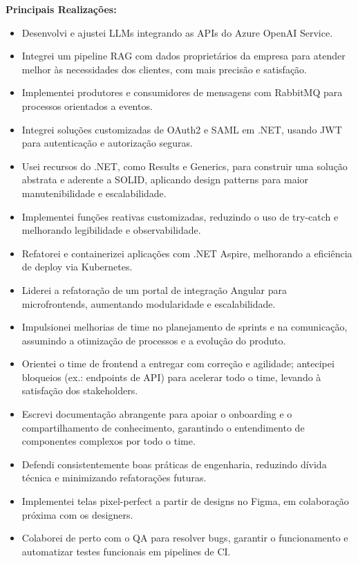 \documentclass[10pt,a4paper]{altacv}
\begin{document}
\textbf{Principais Realizações:}
\begin{itemize}
\setlength{\itemindent}{0.5em}
\item[--] Desenvolvi e ajustei LLMs integrando as APIs do Azure OpenAI Service.
\item[--] Integrei um pipeline RAG com dados proprietários da empresa para atender melhor às necessidades dos clientes, com mais precisão e satisfação.
\item[--] Implementei produtores e consumidores de mensagens com RabbitMQ para processos orientados a eventos.
\item[--] Integrei soluções customizadas de OAuth2 e SAML em .NET, usando JWT para autenticação e autorização seguras.
\item[--] Usei recursos do .NET, como Results e Generics, para construir uma solução abstrata e aderente a SOLID, aplicando design patterns para maior manutenibilidade e escalabilidade.
\item[--] Implementei funções reativas customizadas, reduzindo o uso de try-catch e melhorando legibilidade e observabilidade.
\item[--] Refatorei e containerizei aplicações com .NET Aspire, melhorando a eficiência de deploy via Kubernetes.
\item[--] Liderei a refatoração de um portal de integração Angular para microfrontends, aumentando modularidade e escalabilidade.
\item[--] Impulsionei melhorias de time no planejamento de sprints e na comunicação, assumindo a otimização de processos e a evolução do produto.
\item[--] Orientei o time de frontend a entregar com correção e agilidade; antecipei bloqueios (ex.: endpoints de API) para acelerar todo o time, levando à satisfação dos stakeholders.
\item[--] Escrevi documentação abrangente para apoiar o onboarding e o compartilhamento de conhecimento, garantindo o entendimento de componentes complexos por todo o time.
\item[--] Defendi consistentemente boas práticas de engenharia, reduzindo dívida técnica e minimizando refatorações futuras.
\item[--] Implementei telas pixel-perfect a partir de designs no Figma, em colaboração próxima com os designers.
\item[--] Colaborei de perto com o QA para resolver bugs, garantir o funcionamento e automatizar testes funcionais em pipelines de CI.
\end{itemize}
\end{document}

